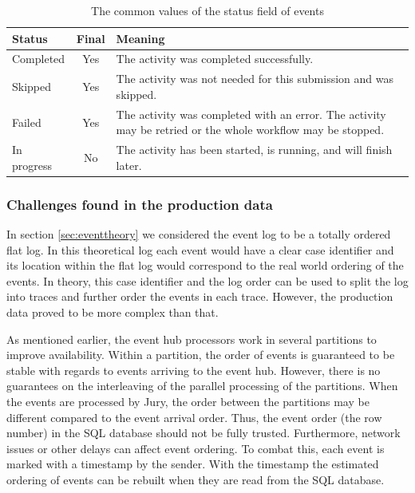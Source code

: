 \begin{table}[htb]
\begin{center}
\begin{tabularx}{\linewidth}{| l | c | X | }
\hline
\textbf{Status} & \textbf{Final} & \textbf{Meaning} \\
\hline
Completed   & Yes & The activity was completed successfully. \\
\hline
Skipped     & Yes & The activity was not needed for this submission and was skipped. \\
\hline
Failed      & Yes & The activity was completed with an error. The activity may be retried or the whole workflow may be stopped. \\
\hline
In progress & No  & The activity has been started, is running, and will finish later. \\
\hline
\end{tabularx}
\end{center}
\caption{The common values of the status field of events}
\label{tab:statuses}
\end{table}

\subsubsection{Challenges found in the production data}
\label{sec:datachallenges}

In section \ref{sec:eventtheory} we considered the event log to be a totally ordered flat log. 
In this theoretical log each event would have a clear case identifier and its location within the flat log would correspond to the real world ordering of the events.
In theory, this case identifier and the log order can be used to split the log into traces and further order the events in each trace.
However, the production data proved to be more complex than that. 

As mentioned earlier, the event hub processors work in several partitions to improve availability.
Within a partition, the order of events is guaranteed to be stable with regards to events arriving to the event hub. 
However, there is no guarantees on the interleaving of the parallel processing of the partitions.
When the events are processed by Jury, the order between the partitions may be different compared to the event arrival order. 
Thus, the event order (the row number) in the SQL database should not be fully trusted.
Furthermore, network issues or other delays can affect event ordering. 
To combat this, each event is marked with a timestamp by the sender. 
With the timestamp the estimated ordering of events can be rebuilt when they are read from the SQL database.

